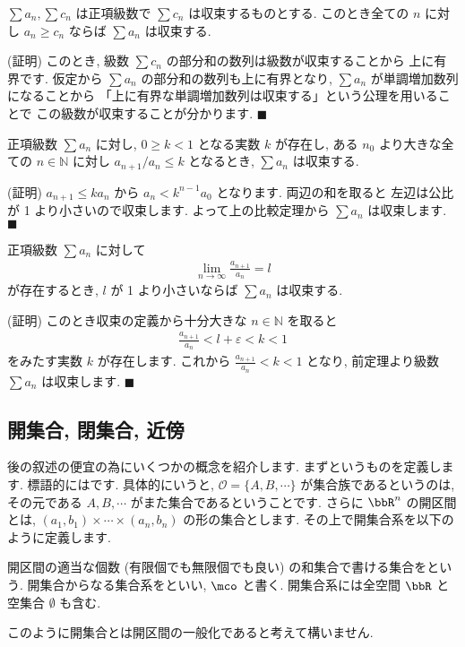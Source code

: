 \documentclass[openany, a4paper, oneside]{jsbook}
\begin{document}
\begin{thm}[比較定理]
 $\sum a_n,\sum c_n$ は正項級数で
 $\sum c_n$ は収束するものとする. このとき全ての $n$ に対し $a_n \geq c_n$
ならば $\sum a_n$ は収束する.
\end{thm}
(証明)
このとき, 級数 $\sum c_n$ の部分和の数列は級数が収束することから
上に有界です. 仮定から $\sum a_n$ の部分和の数列も上に有界となり,
 $\sum a_n$ が単調増加数列になることから
「上に有界な単調増加数列は収束する」という公理を用いることで
この級数が収束することが分かります.  $\blacksquare$

\begin{thm}
正項級数 $\sum a_n$ に対し,  $0\geq k <1$ となる実数
 $k$ が存在し, ある $n_0$ より大きな全ての $n \in \mathbb{N}$ に対し
 $a_{n+1}/a_{n} \leq k$ となるとき,  $\sum a_n$ は収束する.
\end{thm}
(証明)
 $a_{n+1}\leq k a_{n}$ から $a_n<k^{n-1}a_0$ となります. 両辺の和を取ると
左辺は公比が 1 より小さいので収束します. よって上の比較定理から
 $\sum a_n$ は収束します.  $\blacksquare$


\begin{thm}
正項級数 $\sum a_n$ に対して
\begin{align}
    \lim_{n \to \infty}\frac{a_{n+1}}{a_n}=l
\end{align}
が存在するとき,  $l$ が 1 より小さいならば $\sum a_n$ は収束する.
\end{thm}
(証明)
このとき収束の定義から十分大きな $n \in \mathbb{N}$ を取ると
\begin{align}
    \frac{a_{n+1}}{a_n} < l + \varepsilon < k <1
\end{align}
をみたす実数 $k$ が存在します. これから $\frac{a_{n+1}}{a_n}<k<1$ となり,
前定理より級数 $\sum a_n$ は収束します.  $\blacksquare$
\subsection{開集合, 閉集合, 近傍}

後の叙述の便宜の為にいくつかの概念を紹介します.
まずというものを定義します.
標語的にはです.
具体的にいうと,  $\mathcal{O} = \{ A, B, \dotsb \}$ が集合族であるというのは,
その元である $A,B,\dotsb$ がまた集合であるということです.
さらに $\bbR^n$ の開区間とは,  $(a_1,b_1) \times \dotsb \times (a_n,b_n)$ の形の集合とします.
その上で開集合系を以下のように定義します.
\begin{defn}
開区間の適当な個数 (有限個でも無限個でも良い) の和集合で書ける集合をという.
開集合からなる集合系をといい,  $\mco$ と書く.
開集合系には全空間 $\bbR$ と空集合 $\emptyset$ も含む.
\end{defn}
このように開集合とは開区間の一般化であると考えて構いません.
\end{document}
